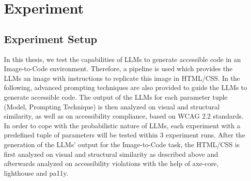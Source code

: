 \chapter{Experiment}\label{chapter:Experiment}

\section{Experiment Setup}
In this thesis, we test the capabilities of LLMs to generate accessible code in an 
Image-to-Code environment. Therefore, a pipeline is used which provides the LLMs an 
image with instructions to replicate this image in HTML/CSS. In the following, 
advanced prompting techniques are also provided to guide the LLMs to generate
accessible code. 
The output of the LLMs for each parameter tuple (Model, Prompting Technique) 
is then analyzed on visual and structural 
similarity, as well as on accessibility compliance, based on WCAG 2.2 standards.
In order to cope with the probabilistic nature of LLMs, each experiment with a 
predefined tuple of parameters will be tested within 3 experiment runs.\newline
After the generation of the LLMs' output for the Image-to-Code task, the HTML/CSS
is first analyzed on visual and structural similarity as described above and afterwards
analyzed on accessibility violations with the help of axe-core, lighthouse and pa11y.


